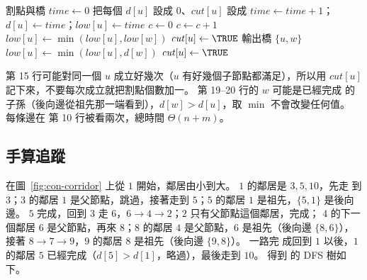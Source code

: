 \begin{pseudo}[label=alg:con-cut]{割點與橋}
    \State $\mathit{time} \gets 0$
    \State 把每個 $d[u]$ 設成 $0$、$\mathit{cut}[u]$ 設成 \FALSE
            \State {}
        \EndIf
    \EndFor
\EndProcedure
{} 
    \State $\mathit{time} \gets \mathit{time} + 1$；$d[u] \gets \mathit{time}$；$\mathit{low}[u] \gets \mathit{time}$
    \State $c \gets 0$ 
         
            \State $c \gets c + 1$
            \State {}
            \State $\mathit{low}[u] \gets \min(\mathit{low}[u], \mathit{low}[w])$
                \State $\mathit{cut}[u] \gets \TRUE$
            \EndIf
                \State 輸出橋 $\{u, w\}$
            \EndIf
         
            \State $\mathit{low}[u] \gets \min(\mathit{low}[u], d[w])$
        \EndIf
    \EndFor
        \State $\mathit{cut}[u] \gets \TRUE$
    \EndIf
\EndProcedure
\end{pseudo}

第 15 行可能對同一個 $u$ 成立好幾次（$u$ 有好幾個子節點都滿足），所以用
$\mathit{cut}[u]$ 記下來，不要每次成立就把割點個數加一。 第 19--20 行的 $w$ 可能是已經完成
的子孫（後向邊從祖先那一端看到），$d[w] > d[u]$，取 $\min$ 不會改變任何值。 每條邊在
第 10 行被看兩次，總時間 $\Theta(n + m)$。

\subsection{手算追蹤}

在圖~\ref{fig:con-corridor} 上從 $1$ 開始，鄰居由小到大。 $1$ 的鄰居是 $3, 5, 10$，先走
到 $3$；$3$ 的鄰居 $1$ 是父節點，跳過，接著走到 $5$；$5$ 的鄰居 $1$ 是祖先，$\{5, 1\}$
是後向邊。 $5$ 完成，回到 $3$ 走 $6$，$6 \to 4 \to 2$；$2$ 只有父節點這個鄰居，完成；
$4$ 的下一個鄰居 $6$ 是父節點，再來 $8$；$8$ 的鄰居 $4$ 是父節點，$6$ 是祖先（後向邊
$\{8, 6\}$），接著 $8 \to 7 \to 9$，$9$ 的鄰居 $8$ 是祖先（後向邊 $\{9, 8\}$）。 一路完
成回到 $1$ 以後，$1$ 的鄰居 $5$ 已經完成（$d[5] > d[1]$，略過），最後走到 $10$。 得到
的 DFS 樹如下。

